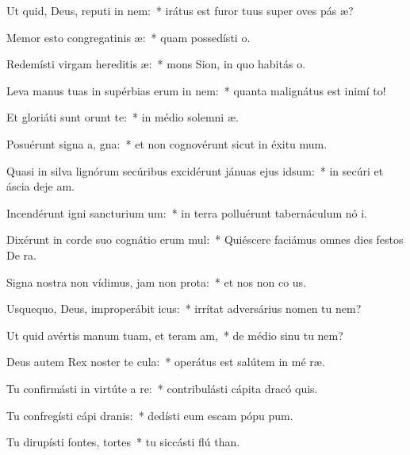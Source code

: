 \item Ut quid, Deus, reputi in nem:~* irátus est furor tuus super oves pás æ?
\item Memor esto congregatinis æ:~* quam possedísti  o.
\item Redemísti virgam hereditis æ:~* mons Sion, in quo habitás  o.
\item Leva manus tuas in supérbias erum in nem:~* quanta malignátus est inimí  to!
\item Et gloriáti sunt  orunt te:~* in médio solemni æ.
\item Posuérunt signa a, gna:~* et non cognovérunt sicut in éxitu  mum.
\item Quasi in silva lignórum secúribus excidérunt jánuas ejus  idsum:~* in secúri et áscia deje am.
\item Incendérunt igni sancturium um:~* in terra polluérunt tabernáculum nó i.
\item Dixérunt in corde suo cognátio erum mul:~* Quiéscere faciámus omnes dies festos De  ra.
\item Signa nostra non vídimus, jam non  prota:~* et nos non co us.
\item Usquequo, Deus, improperábit icus:~* irrítat adversárius nomen tu  nem?
\item Ut quid avértis manum tuam, et teram am,~* de médio sinu tu  nem?
\item Deus autem Rex noster te cula:~* operátus est salútem in mé ræ.
\item Tu confirmásti in virtúte a re:~* contribulásti cápita dracó  quis.
\item Tu confregísti cápi dranis:~* dedísti eum escam pópu pum.
\item Tu dirupísti fontes,  tortes~* tu siccásti flú than.
